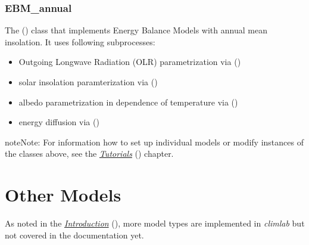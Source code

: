 \documentclass[a4paper,10pt,english]{sphinxmanual}
\begin{document}
\subsubsection{EBM\_annual}
\label{models:ebm-annual}
The {\hyperref[api/climlab.model:climlab.model.ebm.EBM_annual]{\emph{}}} () class that implements Energy Balance Models with annual mean insolation.
It uses following subprocesses:
\begin{itemize}
\item {} 
Outgoing Longwave Radiation (OLR) parametrization via
{\hyperref[api/climlab.radiation:climlab.radiation.AplusBT.AplusBT]{\emph{}}} ()

\item {} 
solar insolation paramterization via
{\hyperref[api/climlab.radiation:climlab.radiation.insolation.AnnualMeanInsolation]{\emph{}}} ()

\item {} 
albedo parametrization in dependence of temperature via
{\hyperref[api/climlab.surface:climlab.surface.albedo.StepFunctionAlbedo]{\emph{}}} ()

\item {} 
energy diffusion via
{\hyperref[api/climlab.dynamics:climlab.dynamics.diffusion.MeridionalDiffusion]{\emph{}}} ()

\end{itemize}

\begin{notice}{note}{Note:}
For information how to set up individual models or modify instances of the classes above, see the {\hyperref[tutorial:tutorial]{\emph{Tutorials}}} () chapter.
\end{notice}


\section{Other Models}
\label{models:other-models}
As noted in the {\hyperref[intro:introduction]{\emph{Introduction}}} (), more model types are implemented in \emph{climlab} but not covered in the documentation yet.
\end{document}
